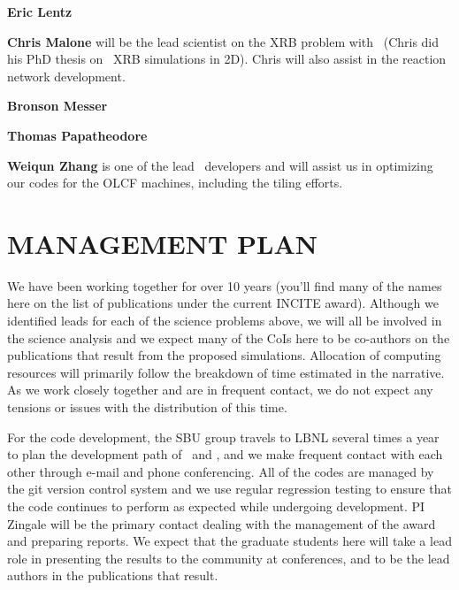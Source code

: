 \documentclass[11pt,letterpaper,english]{article}
\begin{document}
\begin{tightitem}
\item {\bf Eric Lentz}

\item {\bf Chris Malone} will be the lead scientist on the XRB problem
  with \maestro\ (Chris did his PhD thesis on \maestro\ XRB simulations
  in 2D).  Chris will also assist in the reaction network development.

\item {\bf Bronson Messer}

\item {\bf Thomas Papatheodore}

\item {\bf Weiqun Zhang} is one of the lead \boxlib\ developers and will
  assist us in optimizing our codes for the OLCF machines, including the
  tiling efforts.

\end{tightitem} 

\section{MANAGEMENT PLAN}

We have been working together for over 10 years (you'll find many of
the names here on the list of publications under the current INCITE
award).  Although we identified leads for each of the science problems
above, we will all be involved in the science analysis and we expect
many of the CoIs here to be co-authors on the publications that result
from the proposed simulations.
Allocation of computing resources will primarily follow the breakdown 
of time estimated in the narrative.  As we work closely together and are
in frequent contact, we do not expect any tensions or issues with the 
distribution of this time.

For the code development, the SBU group travels to LBNL several times
a year to plan the development path of \maestro\ and \castro, and we 
make frequent contact with each other through e-mail and phone conferencing.
All of the codes are managed by the git version control system and we
use regular regression testing to ensure that the code continues to
perform as expected while undergoing development.
PI Zingale will be the primary contact dealing with the management of
the award and preparing reports.  We expect that the graduate students
here will take a lead role in presenting the results to the community
at conferences, and to be the lead authors in the publications that result.

\end{document}
